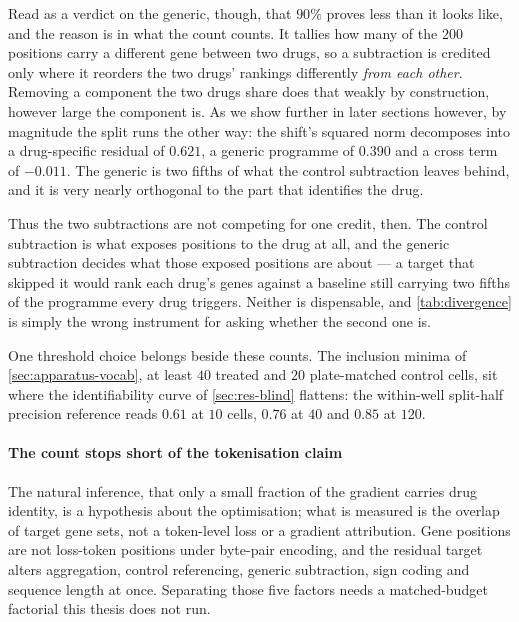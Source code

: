   Read as a verdict on the generic, though, that $90\%$ proves less than it looks
  like, and the reason is in what the count counts. It tallies how many of the $200$
  positions carry a different gene between two drugs, so a subtraction is credited
  only where it reorders the two drugs' rankings differently \emph{from each other}.
  Removing a component the two drugs share does that weakly by construction, however
  large the component is. As we show further in later sections however, by magnitude the split runs the other way: the shift's
  squared norm decomposes into a drug-specific residual of $0.621$, a generic
  programme of $0.390$ and a cross term of $-0.011$. The generic is two fifths of
  what the control subtraction leaves behind, and it is very nearly orthogonal to
  the part that identifies the drug.
  
  Thus the two subtractions are not competing for one credit, then. The control
  subtraction is what exposes positions to the drug at all, and the generic
  subtraction decides what those exposed positions are about --- a target that
  skipped it would rank each drug's genes against a baseline still carrying two
  fifths of the programme every drug triggers. Neither is dispensable, and
  \cref{tab:divergence} is simply the wrong instrument for asking whether the second
  one is.
  
  One threshold choice belongs beside these counts. The inclusion minima of
  \cref{sec:apparatus-vocab}, at least $40$ treated and $20$ plate-matched control
  cells, sit where the identifiability curve of \cref{sec:res-blind} flattens: the
  within-well split-half precision reference reads $0.61$ at $10$ cells, $0.76$ at
  $40$ and $0.85$ at $120$.
  
  \paragraph{The count stops short of the tokenisation claim} The natural inference,
  that only a small fraction of the gradient carries drug identity, is a hypothesis
  about the optimisation; what is measured is the overlap of target gene sets, not a
  token-level loss or a gradient attribution. Gene positions are not loss-token
  positions under byte-pair encoding, and the residual target alters aggregation,
  control referencing, generic subtraction, sign coding and sequence length at once.
  Separating those five factors needs a matched-budget factorial this thesis does not
  run.
  
  
